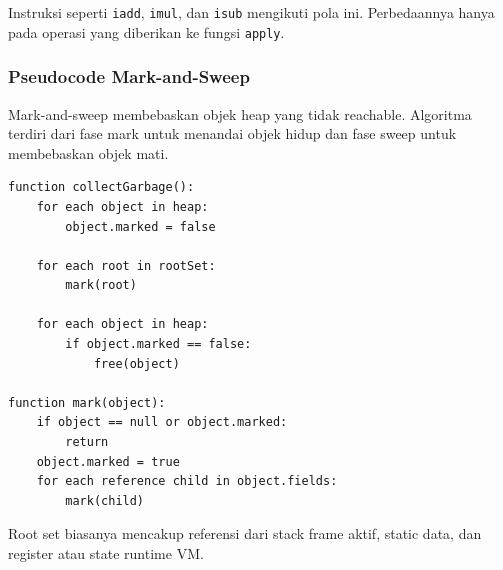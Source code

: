 Instruksi seperti \texttt{iadd}, \texttt{imul}, dan \texttt{isub} mengikuti pola ini. Perbedaannya hanya pada operasi yang diberikan ke fungsi \texttt{apply}.

\subsubsection{Pseudocode Mark-and-Sweep}

\begin{jawab}
Mark-and-sweep membebaskan objek heap yang tidak reachable. Algoritma terdiri dari fase mark untuk menandai objek hidup dan fase sweep untuk membebaskan objek mati.
\end{jawab}

\begin{lstlisting}[caption={Pseudocode garbage collection mark-and-sweep}, label={lst:mark-sweep}]
function collectGarbage():
    for each object in heap:
        object.marked = false

    for each root in rootSet:
        mark(root)

    for each object in heap:
        if object.marked == false:
            free(object)

function mark(object):
    if object == null or object.marked:
        return
    object.marked = true
    for each reference child in object.fields:
        mark(child)
\end{lstlisting}

Root set biasanya mencakup referensi dari stack frame aktif, static data, dan register atau state runtime VM.

